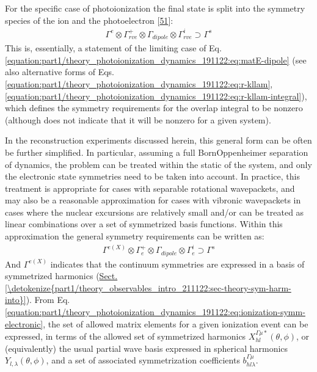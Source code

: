 \documentclass[letterpaper,table,10pt,english]{jupyterBook}
\begin{document}
\sphinxAtStartPar
For the specific case of photoionization the final state is split into the symmetry species of the ion and the photoelectron {[}\hyperlink{cite.backmatter/bibliography:id797}{51}{]}:
\begin{equation}\label{equation:part1/theory_photoionization_dynamics_191122:eq:ionization-symm}
\begin{split}
\Gamma^{e}\otimes\Gamma_{rve}^{+}\otimes\Gamma_{dipole}\otimes\Gamma_{rve}^{i}\supset\Gamma^{s}
\end{split}
\end{equation}
\sphinxAtStartPar
This is, essentially, a statement of the limiting case of Eq. \eqref{equation:part1/theory_photoionization_dynamics_191122:eq:matE-dipole} (see also alternative forms of Eqs. \eqref{equation:part1/theory_photoionization_dynamics_191122:eq:r-kllam}, \eqref{equation:part1/theory_photoionization_dynamics_191122:eq:r-kllam-integral}), which defines the symmetry requirements for the overlap integral to be non\sphinxhyphen{}zero (although does not indicate that it will be non\sphinxhyphen{}zero for a given system).

\sphinxAtStartPar
In the reconstruction experiments discussed herein, this general form can be often be further simplified. In particular, assuming a full Born\sphinxhyphen{}Oppenheimer separation of dynamics, the problem can be treated within the static {\hyperref[\detokenize{backmatter/glossary:term-PG}]{}} of the system, and only the electronic state symmetries need to be taken into account. In practice, this treatment is appropriate for cases with separable rotational wavepackets, and may also be a reasonable approximation for cases with vibronic wavepackets in cases where the nuclear excursions are relatively small and/or can be treated as linear combinations over a set of symmetrized basis functions. Within this approximation the general symmetry requirements can be written as:
\begin{equation}\label{equation:part1/theory_photoionization_dynamics_191122:eq:ionization-symm-electronic}
\begin{split}
\Gamma^{e(X)}\otimes\Gamma_{e}^{+}\otimes\Gamma_{dipole}\otimes\Gamma_{e}^{i}\supset\Gamma^{s}
\end{split}
\end{equation}
\sphinxAtStartPar
And \(\Gamma^{e(X)}\) indicates that the continuum symmetries are expressed in a basis of symmetrized harmonics (\hyperref[\detokenize{part1/theory_observables_intro_211122:sec-theory-sym-harm-into}]{Sect.\@ \ref{\detokenize{part1/theory_observables_intro_211122:sec-theory-sym-harm-into}}}). From Eq. \eqref{equation:part1/theory_photoionization_dynamics_191122:eq:ionization-symm-electronic}, the set of allowed matrix elements for a given ionization event can be expressed, in terms of the allowed set of symmetrized harmonics \(X_{hl}^{\Gamma\mu*}(\theta,\phi)\), or (equivalently) the usual partial wave basis expressed in spherical harmonics \(Y_{l,\lambda}(\theta,\phi)\), and a set of associated symmetrization coefficients \(b_{hl\lambda}^{\Gamma\mu}\).
\end{document}
